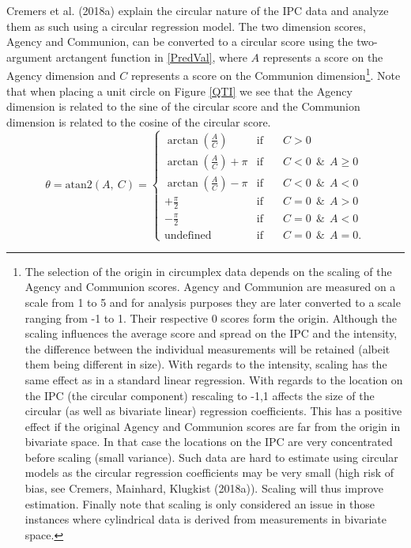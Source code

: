 \documentclass[man,mask]{apa6}
\let\rmarkdownfootnote\footnote%
\def\footnote{\protect\rmarkdownfootnote}
\begin{document}
\indent Cremers et al. (2018a) explain the circular nature of the IPC data and
analyze them as such using a circular regression model. The two dimension
scores, Agency and Communion, can be converted to a circular score using the
two-argument arctangent function in \eqref{PredVal}, where \(A\) represents a
score on the Agency dimension and \(C\) represents a score on the Communion
dimension\footnote{The selection of the origin in circumplex data depends on
the scaling of the Agency and Communion scores. Agency and Communion are
measured on a scale from 1 to 5 and for analysis purposes they are later
converted to a scale ranging from -1 to 1.  Their respective 0 scores form the
origin. Although the scaling influences the average score and spread on the IPC and the intensity, the difference between the individual measurements will be retained (albeit them being different in size). With regards to the intensity, scaling has the same effect as in a standard linear regression. With regards to the location on the IPC (the circular component) rescaling to -1,1 affects the size of the circular (as well as bivariate linear) regression coefficients. This has a positive effect if the original Agency and Communion scores are far from the origin in bivariate space. In that case the locations on the IPC are very concentrated before scaling (small variance). Such data are hard to estimate using circular models as the circular regression coefficients may be very small (high risk of bias, see Cremers, Mainhard, Klugkist (2018a)). Scaling will thus improve estimation. Finally note that scaling is only considered an issue in those instances where cylindrical data is derived from measurements in bivariate space.}. Note that
when placing a unit circle on Figure \ref{QTI} we see that the Agency dimension
is related to the sine of the circular score and the Communion dimension is
related to the cosine of the circular score.
\begin{equation}\label{PredVal}
\theta          = \text{atan2}\left(A, \: C\right)  =
\left\{{\begin{array}{lcl}
                                                                       \arctan\left(\frac{A}{C}\right) & \text{if}  \quad&C > 0 \\
\arctan\left(\frac{A}{C}\right) + \pi & \text{if}  \quad& C  <  0  \:\: \&\:\: A \geq 0\\
 \arctan\left(\frac{A}{C}\right) - \pi & \text{if}  \quad&C  <  0 \:\:  \&\:\:A  < 0\\
 +\frac{\pi}{2} & \text{if}  \quad& C  =  0  \:\: \&\:\:A > 0\\
 -\frac{\pi}{2} & \text{if}  \quad& C =  0  \:\: \&\:\:A < 0\\
 \text{undefined} & \text{if} \quad& C =  0   \:\: \&\:\:A = 0.
 \end{array}}
\right.
\end{equation}
\end{document}
